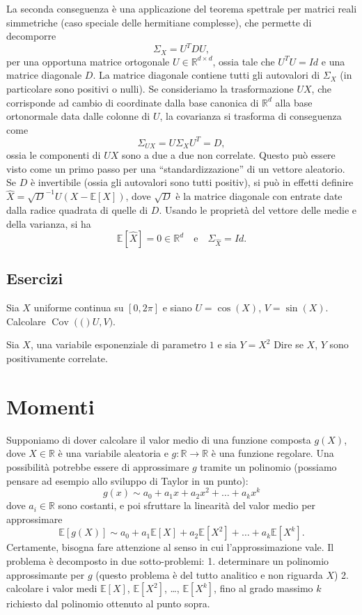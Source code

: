 \documentclass[
  italian,
  letterpaper,
]{book}
\newcommand{\bra}[1]{\left( #1 \right)}
\newcommand{\sqa}[1]{\left[ #1 \right]}
\newcommand{\R}{\mathbb{R}}
\newcommand{\E}[1]{\mathbb{E}\sqa{#1}}
\newcommand{\Cov}[1]{\operatorname{Cov}\bra{#1}}
\theoremstyle{definition}
\theoremstyle{remark}
\begin{document}
La seconda conseguenza è una applicazione del teorema spettrale per
matrici reali simmetriche (caso speciale delle hermitiane complesse),
che permette di decomporre \[ \Sigma_X = U^T D U,\] per una opportuna
matrice ortogonale \(U \in \R^{d\times d}\), ossia tale che
\(U^T U = Id\) e una matrice diagonale \(D\). La matrice diagonale
contiene tutti gli autovalori di \(\Sigma_X\) (in particolare sono
positivi o nulli). Se consideriamo la trasformazione \(UX\), che
corrisponde ad cambio di coordinate dalla base canonica di \(\R^d\) alla
base ortonormale data dalle colonne di \(U\), la covarianza si trasforma
di conseguenza come \[ \Sigma_{UX} = U \Sigma_X U^T = D,\] ossia le
componenti di \(UX\) sono a due a due non correlate. Questo può essere
visto come un primo passo per una ``standardizzazione'' di un vettore
aleatorio. Se \(D\) è invertibile (ossia gli autovalori sono tutti
positiv), si può in effetti definire
\(\hat{X} = \sqrt{D}^{-1} U(X-\E{X})\), dove \(\sqrt{D}\) è la matrice
diagonale con entrate date dalla radice quadrata di quelle di \(D\).
Usando le proprietà del vettore delle medie e della varianza, si ha
\[ \E{\hat{X} } = 0 \in \R^d \quad \text{e} \quad \Sigma_{ \hat{X} } = Id.\]

\subsection{Esercizi}\label{esercizi-21}

Sia \(X\) uniforme continua su \([0, 2 \pi]\) e siano \(U = \cos(X)\),
\(V = \sin(X)\). Calcolare \(\Cov(U,V)\).

Sia \(X\), una variabile esponenziale di parametro \(1\) e sia
\(Y = X^2\) Dire se \(X\), \(Y\) sono positivamente correlate.

\section{Momenti}\label{sec-mgf}

Supponiamo di dover calcolare il valor medio di una funzione composta
\(g(X)\), dove \(X \in \R\) è una variabile aleatoria e \(g:\R \to \R\)
è una funzione regolare. Una possibilità potrebbe essere di approssimare
\(g\) tramite un polinomio (possiamo pensare ad esempio allo sviluppo di
Taylor in un punto):
\[ g(x) \sim a_0 + a_1 x + a_2 x^2 + \ldots + a_k x^k\] dove
\(a_i \in \R\) sono costanti, e poi sfruttare la linearità del valor
medio per approssimare
\[ \E{g(X)} \sim a_0 + a_1 \E{X} + a_2 \E{X^2}+ \ldots + a_k \E{X^k}.\]
Certamente, bisogna fare attenzione al senso in cui l'approssimazione
vale. Il problema è decomposto in due sotto-problemi: 1. determinare un
polinomio approssimante per \(g\) (questo problema è del tutto analitico
e non riguarda \(X\)) 2. calcolare i valor medi \(\E{X}\), \(\E{X^2}\),
\ldots, \(\E{X^k}\), fino al grado massimo \(k\) richiesto dal polinomio
ottenuto al punto sopra.
\end{document}
